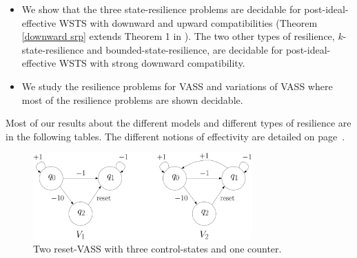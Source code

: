 \documentclass[runningheads]{llncs}
\newcommand{\post}{\textsf{post}}
\begin{document}
\begin{itemize}
\item We show that the three state-resilience problems are decidable for post-ideal-effective WSTS with downward and upward compatibilities (Theorem \ref{downward srp} extends Theorem 1 in \cite{DBLP:journals/corr/PrasadZ16}).
The two other types of resilience, {$k$-state-resilience} and {bounded-state-resilience}, are decidable for post-ideal-effective WSTS with strong downward compatibility.
%
%
%
\item We study the resilience problems for VASS and variations of VASS where most of the resilience problems are shown decidable.
\end{itemize}

Most of our results about the different models and different types of resilience are in the following tables. The different notions of effectivity are detailed on page~\pageref{on effectivity}.


\iffalse
 \begin{center}
	\begin{figure}
			\hspace{0.8cm}
\includegraphics[width=0.75\textwidth]{FigureCD}
	\caption{Two reset-VASS with three control-states and one counter.}
					\label{r-V}
	\end{figure}
\end{center}
\end{document}
